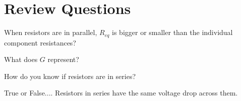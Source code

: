\documentclass{handout}
\begin{document}
\clearpage


\section{Review Questions}
\begin{questions}
\item When resistors are in parallel, $R_{eq}$ is bigger or smaller than the individual component resistances? 


\item What does $G$ represent? 


\item How do you know if resistors are in series? 


\item True or False.... Resistors in series have the same voltage drop across them. 


\newpage


\end{questions}
\end{document}
